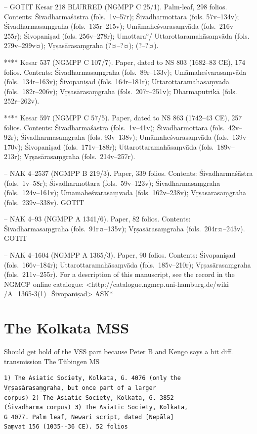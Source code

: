 \documentclass[12pt]{book}
\begin{document}
-- GOTIT Kesar 218 BLURRED (NGMPP C 25/1). Palm-leaf, 298 folios.
Contents: Śivadharmaśāstra (fols.~1v--57r); Śivadharmottara (fols.
57v--134v); Śivadharmasaṃgraha (fols.~135r--215v); Umāmaheśvarasaṃvāda
(fols.~216v--255r); Śivopaniṣad (fols. 256v--278r); Umottara°/
Uttarottaramahāsaṃvāda (fols. 279v--299v¤); Vṛṣasārasaṃgraha (?¤--?¤);
(?--?¤).

**** Kesar 537 (NGMPP C 107/7). Paper, dated to NS 803 (1682--83 CE),
174 folios. Contents: Śivadharmasaṃgraha (fols.~89r--133v);
Umāmaheśvarasaṃvāda (fols.~134r--163v); Śivopaniṣad (fols. 164r--181r);
Uttarottaramahāsaṃvāda (fols.~182r--206v); Vṛṣasārasaṃgraha
(fols.~207r--251v); Dharmaputrikā (fols. 252r--262v).

**** Kesar 597 (NGMPP C 57/5). Paper, dated to NS 863 (1742--43 CE), 257
folios. Contents: Śivadharmaśāstra (fols.~1v--41v); Śivadharmottara
(fols.~42v--92r); Śivadharmasaṃgraha (fols. 93v--138v);
Umāmaheśvarasaṃvāda (fols.~139v-- 170v); Śivopaniṣad (fols.~171v--188r);
Uttarottaramahāsaṃvāda (fols.~189v-- 213r); Vṛṣasārasaṃgraha
(fols.~214v--257r).

-- NAK 4--2537 (NGMPP B 219/3). Paper, 339 folios. Contents:
Śivadharmaśāstra (fols.~1v--58r); Śivadharmottara (fols.~59v--123v);
Śivadharmasaṃgraha (fols.~124v--161v); Umāmaheśvarasaṃvāda (fols.
162v--238v); Vṛṣasārasaṃgraha (fols.~239v--338v). GOTIT

-- NAK 4--93 (NGMPP A 1341/6). Paper, 82 folios. Contents:
Śivadharmasaṃgraha (fols.~91r¤--135v); Vṛṣasārasaṃgraha
(fols.~204r¤--243v). GOTIT

-- NAK 4--1604 (NGMPP A 1365/3). Paper, 90 folios. Contents: Śivopaniṣad
(fols.~166v--184r); Uttarottaramahāsaṃvāda (fols.~185v--210r);
Vṛṣasārasaṃgraha (fols.~211v--255r). For a description of this
manuscript, see the record in the NGMCP online catalogue:
\textless{}http://catalogue.ngmcp.uni-hamburg.de/wiki
/A\_1365-3(1)\_Śivopaniṣad\textgreater{} ASK*

{%
\section{The Kolkata MSS}\label{the-kolkata-mss}}

Should get hold of the VSS part because Peter B and Kengo says a bit
diff. transmission The Tübingen MS

\begin{verbatim}
1) The Asiatic Society, Kolkata, G. 4076 (only the
Vṛṣasārasaṃgraha, but once part of a larger
corpus) 2) The Asiatic Society, Kolkata, G. 3852
(Śivadharma corpus) 3) The Asiatic Society, Kolkata,
G 4077. Palm leaf, Newari script, dated [Nepāla]
Saṃvat 156 (1035--36 CE). 52 folios
\end{verbatim}
\end{document}
